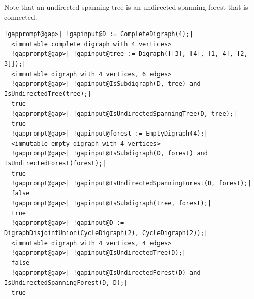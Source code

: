 \documentclass[a4paper,11pt]{report}
\begin{document}
{{{ Note that an undirected spanning tree is an undirected spanning forest that is
connected. 
\begin{Verbatim}[commandchars=!@|,fontsize=\small,frame=single,label=Example]
  !gapprompt@gap>| !gapinput@D := CompleteDigraph(4);|
  <immutable complete digraph with 4 vertices>
  !gapprompt@gap>| !gapinput@tree := Digraph([[3], [4], [1, 4], [2, 3]]);|
  <immutable digraph with 4 vertices, 6 edges>
  !gapprompt@gap>| !gapinput@IsSubdigraph(D, tree) and IsUndirectedTree(tree);|
  true
  !gapprompt@gap>| !gapinput@IsUndirectedSpanningTree(D, tree);|
  true
  !gapprompt@gap>| !gapinput@forest := EmptyDigraph(4);|
  <immutable empty digraph with 4 vertices>
  !gapprompt@gap>| !gapinput@IsSubdigraph(D, forest) and IsUndirectedForest(forest);|
  true
  !gapprompt@gap>| !gapinput@IsUndirectedSpanningForest(D, forest);|
  false
  !gapprompt@gap>| !gapinput@IsSubdigraph(tree, forest);|
  true
  !gapprompt@gap>| !gapinput@D := DigraphDisjointUnion(CycleDigraph(2), CycleDigraph(2));|
  <immutable digraph with 4 vertices, 4 edges>
  !gapprompt@gap>| !gapinput@IsUndirectedTree(D);|
  false
  !gapprompt@gap>| !gapinput@IsUndirectedForest(D) and IsUndirectedSpanningForest(D, D);|
  true
\end{Verbatim}
 }

 }

 }

 
\end{document}
